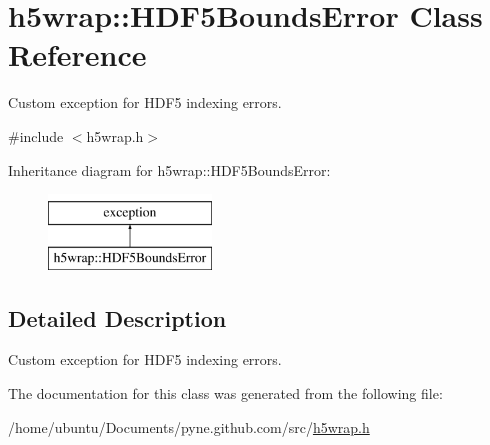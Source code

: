 \hypertarget{classh5wrap_1_1_h_d_f5_bounds_error}{}\section{h5wrap\+:\+:H\+D\+F5\+Bounds\+Error Class Reference}
\label{classh5wrap_1_1_h_d_f5_bounds_error}


Custom exception for H\+D\+F5 indexing errors.  




{\ttfamily \#include $<$h5wrap.\+h$>$}

Inheritance diagram for h5wrap\+:\+:H\+D\+F5\+Bounds\+Error\+:\begin{figure}[H]
\begin{center}
\leavevmode
\includegraphics[height=2.000000cm]{classh5wrap_1_1_h_d_f5_bounds_error}
\end{center}
\end{figure}


\subsection{Detailed Description}
Custom exception for H\+D\+F5 indexing errors. 

The documentation for this class was generated from the following file\+:\begin{DoxyCompactItemize}
\item 
/home/ubuntu/\+Documents/pyne.\+github.\+com/src/\hyperlink{h5wrap_8h}{h5wrap.\+h}\end{DoxyCompactItemize}

